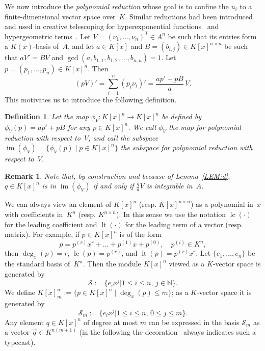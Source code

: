 \documentclass{sig-alternate}
\newtheorem{remark}[theorem]{Remark}
\newtheorem{defi}[theorem]{Definition}
\newcommand{\bN}{ {\mathbb N}}
\newcommand{\cS}{ {\mathcal S}}
\def\lc{\operatorname{lc}}
\def\lt{\operatorname{lt}}
\def\im{\operatorname{im}}
\begin{document}
We now introduce the \emph{polynomial reduction} whose goal is to confine the $u_i$ to a finite-dimensional
vector space over~$K$. Similar reductions had been introduced and used in creative telescoping
for hyperexponential functions~\cite{bostan13a} and hypergeometric terms~\cite{chen15a}.
Let $V = (\nu_1, \ldots, \nu_n)^T\in A^n$ be such that its entries form a $K(x)$-basis of~$A$,
and let $a\in K[x]$ and $B = (b_{i, j})\in K[x]^{n \times n}$ be such that $aV'=BV$ and
$\gcd(a, b_{1, 1}, b_{1, 2}, \ldots, b_{n ,n})=1$. Let $p = (p_1, \ldots, p_n)\in K[x]^n$. Then
\begin{equation} \label{EQ:polyred}
  (pV)' = \sum_{i=1}^n (p_i \nu_i)' = \frac{ap' + pB}{a}\, V.
\end{equation}
This motivates us to introduce the following definition.
\begin{defi}
Let the map $\phi_V\colon K[x]^n \rightarrow K[x]^n$
be defined by $\phi_V(p) = ap' + pB$ for any $p\in K[x]^n$.
We call $\phi_V$ the \emph{map for polynomial reduction} with respect to~$V$, and call
the subspace $\im(\phi_V) = \{\phi_V(p) \mid p \in K[x]^n\}$
the \emph{subspace for polynomial reduction} with respect to~$V$.
\end{defi}
\begin{remark}
Note that, by construction and because of Lemma~\ref{LEM:d}, $q\in K[x]^n$ is in
$\im(\phi_V)$ if and only if $\frac{q}{a}V$ is integrable in~$A$.
\end{remark}

We can always view an element of $K[x]^n$ (resp. $K[x]^{n\times n}$) as a polynomial in~$x$
with coefficients in~$K^n$ (resp. $K^{n\times n}$). In this sense we use the notation $\lc(\cdot)$
for the leading coefficient and $\lt(\cdot)$ for the leading term of a vector (resp. matrix).
For example, if $p\in K[x]^n$ is of the form
\[
  p = p^{(r)}x^r + \dots + p^{(1)}x + p^{(0)},\quad p^{(i)}\in K^n,
\]
then $\deg_x(p)=r$, $\lc(p)=p^{(r)}$, and $\lt(p)=p^{(r)}x^r$.
Let $\{e_1, \ldots, e_n\}$ be the standard basis of~$K^n$.
Then the module $K[x]^n$ viewed as a $K$-vector space is generated by
\[
  \cS := \bigl\{e_ix^j \mathrel{\big|} 1\leq i \leq n,\, j\in \bN\bigr\}.
\]
We define $K[x]_m^n:=\{p\in K[x]^n \mid \deg_x(p) \leq m\}$; as a $K$-vector
space it is generated by
\[
  \cS_m := \bigl\{e_ix^j \mathrel{\big|} 1\leq i \leq n,\, 0\leq j\leq m\bigr\}.
\]
Any element $q\in K[x]^n$ of degree at most $m$ can be expressed in the
basis $\cS_m$ as a vector $\vec{q}\in K^{n(m+1)}$ (in the following the
decoration~\raisebox{-1pt}{$\vec{}\;$} always indicates such a typecast).
\end{document}
